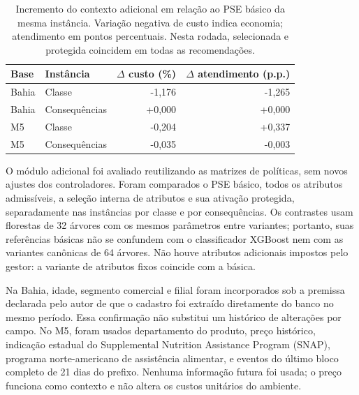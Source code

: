 
\begin{table}[htbp]

\centering\small

\caption{Incremento do contexto adicional em relação ao PSE básico da mesma instância. Variação negativa de custo indica economia; atendimento em pontos percentuais. Nesta rodada, selecionada e protegida coincidem em todas as recomendações.}

\label{tab:contexto_adicional_20261017}

\begin{tabular}{llrr}

\toprule

Base & Instância & $\Delta$ custo (\%) & $\Delta$ atendimento (p.p.) \\

\midrule

Bahia & Classe & -1,176 & -1,265 \\

Bahia & Consequências & +0,000 & +0,000 \\

M5 & Classe & -0,204 & +0,337 \\

M5 & Consequências & -0,035 & -0,003 \\

\bottomrule

\end{tabular}

\end{table}

O módulo adicional foi avaliado reutilizando as matrizes de políticas, sem novos ajustes dos controladores. Foram comparados o PSE básico, todos os atributos admissíveis, a seleção interna de atributos e sua ativação protegida, separadamente nas instâncias por classe e por consequências. Os contrastes usam florestas de 32 árvores com os mesmos parâmetros entre variantes; portanto, suas referências básicas não se confundem com o classificador XGBoost nem com as variantes canônicas de 64 árvores. Não houve atributos adicionais impostos pelo gestor: a variante de atributos fixos coincide com a básica.

Na Bahia, idade, segmento comercial e filial foram incorporados sob a premissa declarada pelo autor de que o cadastro foi extraído diretamente do banco no mesmo período. Essa confirmação não substitui um histórico de alterações por campo. No M5, foram usados departamento do produto, preço histórico, indicação estadual do Supplemental Nutrition Assistance Program (SNAP), programa norte-americano de assistência alimentar, e eventos do último bloco completo de 21 dias do prefixo. Nenhuma informação futura foi usada; o preço funciona como contexto e não altera os custos unitários do ambiente.


